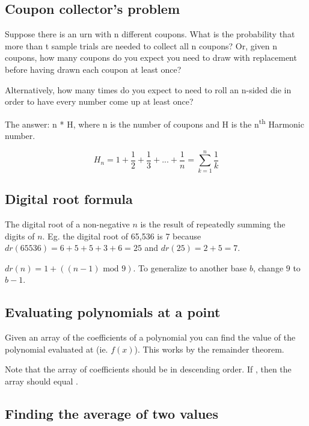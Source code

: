 \subsection*{Coupon collector's problem}

Suppose there is an urn with n different coupons. What is the probability that more than t sample trials are needed to collect all n coupons? Or, given n coupons, how many coupons do you expect you need to draw with replacement before having drawn each coupon at least once?

Alternatively, how many times do you expect to need to roll an n-sided die in order to have every number come up at least once?

The answer: n * H, where n is the number of coupons and H is the n\textsuperscript{th} Harmonic number.

$$H_n = 1 + \frac{1}{2} + \frac{1}{3} + ... + \frac{1}{n} = \sum_{k=1}^n \frac{1}{k}$$

\subsection*{Digital root formula}

The digital root of a non-negative $n$ is the result of repeatedly summing the digits of $n$. Eg. the digital root of 65,536 is 7 because $dr(65536) = 6+5+5+3+6 = 25$ and $dr(25) = 2+5 = 7$. 

$dr(n) = 1 + ((n-1) \text{ mod } 9)$. To generalize to another base $b$, change $9$ to $b-1$.

\subsection*{Evaluating polynomials at a point}

Given an array of the coefficients of a polynomial you can find the value of the polynomial evaluated at  (ie. $f(x)$). This works by the remainder theorem.



Note that the array of coefficients should be in descending order. If , then the array should equal .

\subsection*{Finding the average of two values}

